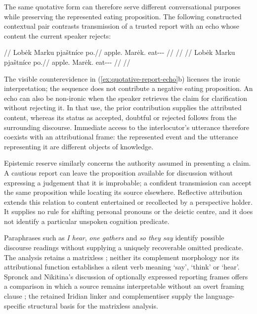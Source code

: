 The same quotative form can therefore serve different conversational
purposes while preserving the represented eating proposition. The following
constructed contextual pair contrasts transmission of a trusted report with
an echo whose content the current speaker rejects:

\pex\label{ex:quotative-report-echo}%
\a
\begingl
\glpreamble {}//
\gla Lobėk Marku pjaštníce po.//
\glb apple.\Dir{} Marėk.\Trs{} eat-\Trs{}-\Pf{}-\Lnk{} \Compl{}//
\glft {}//
\endgl
\a
\begingl
\glpreamble {}//
\gla Lobėk Marku pjaštníce po.//
\glb apple.\Dir{} Marėk.\Trs{} eat-\Trs{}-\Pf{}-\Lnk{} \Compl{}//
\glft {}//
\endgl
\xe

The visible counterevidence in (\ref{ex:quotative-report-echo}b) licenses
the ironic interpretation; the sequence  does not contribute
a negative eating proposition. An echo can also be non-ironic when the
speaker retrieves the claim for clarification without rejecting it. In
that use, the prior contribution supplies the attributed content, whereas
its status as accepted, doubtful or rejected follows from the surrounding
discourse. Immediate access to the interlocutor's utterance therefore
coexists with an attributional frame: the represented event and the
utterance representing it are different objects of knowledge.

Epistemic reserve similarly concerns the authority assumed in presenting a
claim. A cautious report can leave the proposition available for discussion
without expressing a judgement that it is improbable; a confident
transmission can accept the same proposition while locating its source
elsewhere. Reflective attribution extends this relation to content
entertained or recollected by a perspective holder. It supplies no rule
for shifting personal pronouns or the deictic centre, and it does not
identify a particular unspoken cognition predicate.

Paraphrases such as \textit{I hear}, \textit{one gathers} and
\textit{so they say} identify possible discourse readings without supplying
a uniquely recoverable omitted predicate. The analysis retains a
matrixless ; neither its complement morphology nor its
attributional function establishes a silent verb meaning `say', `think'
or `hear'. Spronck and Nikitina's discussion of optionally expressed
reporting frames offers a comparison in which a source remains
interpretable without an overt framing clause
\cite[§2.2, pp.~126--128]{sproncknikitina2019}; the retained Iridian
linker and complementiser supply the language-specific structural basis
for the matrixless  analysis.

